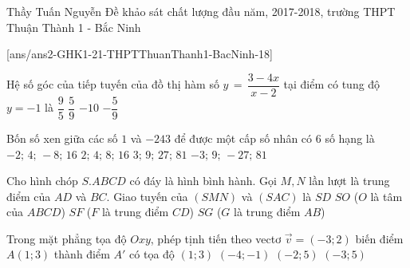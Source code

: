 \begin{name}
{Thầy  Tuấn Nguyễn}
{Đề khảo sát chất lượng đầu năm, 2017-2018, trường THPT Thuận Thành 1 - Bắc Ninh}
\end{name}
\setcounter{ex}{0}
[ans/ans2-GHK1-21-THPTThuanThanh1-BacNinh-18]

\begin{ex}%
 Hệ số góc của tiếp tuyến của đồ thị hàm số $y\,=\,\dfrac{3-4x}{x-2}$ tại điểm có tung độ $y=-1$ là
\choice
{\True $\dfrac{9}{5}$}
{$\dfrac{5}{9}$}
{$-10$}
{$-\dfrac{5}{9}$}
\end{ex}
\begin{ex}%
 Bốn số xen giữa các số $1$ và $- 243$ để được một cấp số nhân có $6$ số hạng là
\choice
{$-2;\,4;\,-8;\,16$}
{$2;\,4;\,8;\,16$}
{$3;\,9;\,27;\,81$}
{\True $-3;\,9;\,-27;\,81$}
\end{ex}
\begin{ex}%
 Cho hình chóp $S.ABCD$ có đáy là hình bình hành. Gọi $M,N$ lần lượt là trung điểm của $AD$ và $BC$. Giao tuyến của $(SMN)$ và $(SAC)$ là
\choice
{$SD$}
{\True $SO$ ($O$ là tâm của $ABCD$)}
{$SF$ ($F$ là trung điểm $CD$)}
{$SG$ ($G$ là trung điểm $AB$)}
\end{ex}
\begin{ex}%
 Trong mặt phẳng tọa độ $Oxy$, phép tịnh tiến theo vectơ $\overrightarrow{v}=\left( -3;2 \right)$ biến điểm $A(1;3)$ thành điểm ${A}'$ có tọa độ
\choice
{$(1;3)$}
{$(-4;-1)$}
{\True $(-2;5)$}
{$(-3;5)$}
\end{ex}
